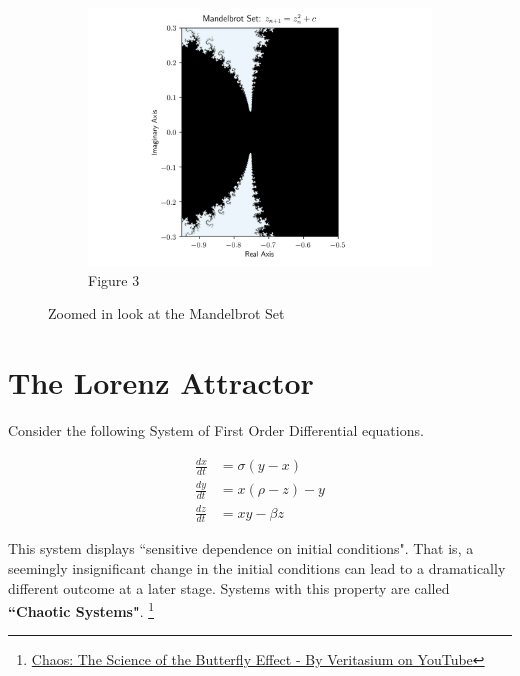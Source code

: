 \documentclass[14pts]{article}
\begin{document}
    \begin{figure}\ContinuedFloat
        \begin{subfigure}{\textwidth}
            \includegraphics[width = \textwidth]{Images/Mandelbrot_section3.png}
            \caption{Figure 3}
        \end{subfigure}
        \caption{Zoomed in look at the Mandelbrot Set}
    \end{figure}

    \pagebreak
    \huge
    \section{The Lorenz Attractor}
    \normalsize
    Consider the following System of First Order Differential equations.

    \begin{align}
        \frac{dx}{dt} &= \sigma (y-x) \\
        \frac{dy}{dt} &= x(\rho-z) - y \\
        \frac{dz}{dt} &= xy - \beta z
    \end{align}


    This system displays ``sensitive dependence on initial conditions". That is, a seemingly insignificant change in the initial conditions can lead to a dramatically different outcome at a later stage.
    Systems with this property are called \textbf{``Chaotic Systems"}. \footnote[2]{\href{https://www.youtube.com/watch?v=fDek6cYijxI&ab_channel=Veritasium}{Chaos: The Science of the Butterfly Effect - By Veritasium on YouTube}}
\end{document}

